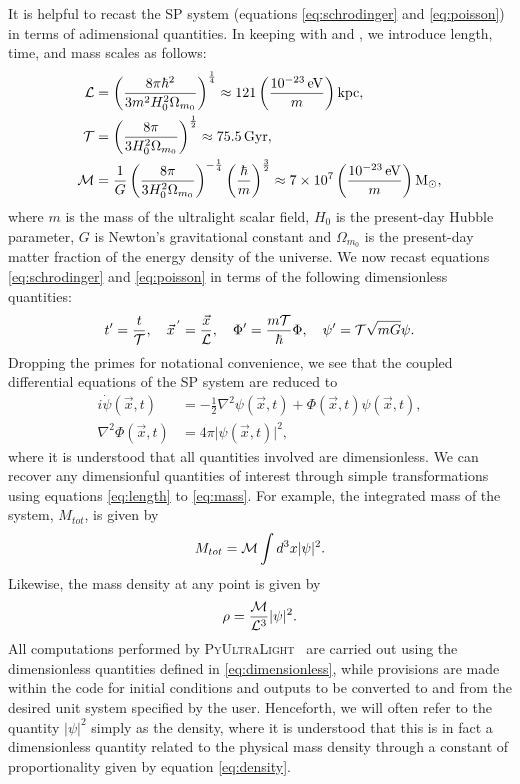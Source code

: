 \documentclass[a4paper,11pt]{article}
\newcommand{\PyUltraLight}{\textsc{PyUltraLight }}
\begin{document}
It is helpful to recast the SP system (equations \ref{eq:schrodinger} and \ref{eq:poisson}) in terms of adimensional quantities. In keeping with \cite{Schive2014} and \cite{Paredes2016}, we introduce length, time, and mass scales as follows:
\begin{align}
    \CMcal{L}&=\left(\frac{8\pi\hbar^2}{3 m^2H_0^2\Omega_{m_0}}\right)^{\frac{1}{4}}\approx121\left(\frac{10^{-23}\operatorname{eV}}{m}\right)\operatorname{kpc},\label{eq:length}\\
    \CMcal{T}&=\left(\frac{8\pi}{3 H_0^2\Omega_{m_0}}\right)^{\frac{1}{2}}\approx75.5 \operatorname{Gyr},\label{eq:time}\\
    \CMcal{M}&=\frac{1}{G}\left(\frac{8\pi}{3 H_0^2\Omega_{m_0}}\right)^{-\frac{1}{4}}\left(\frac{\hbar}{m}\right)^{\frac{3}{2}}\approx 7\times 10^7\left(\frac{10^{-23}\operatorname{eV}}{m}\right)\operatorname{M}_{\odot},\label{eq:mass}
\end{align}
where $m$ is the mass of the ultralight scalar field, $H_0$ is the present-day Hubble parameter, $G$ is Newton's gravitational constant and $\Omega_{m_0}$ is the present-day matter fraction of the energy density of the universe. We now recast equations \ref{eq:schrodinger} and \ref{eq:poisson} in terms of the following dimensionless quantities:
\begin{equation}\label{eq:dimensionless}
    t'=\frac{t}{\CMcal{T}},\quad
    \vec{x}^{\,'}=\frac{\vec{x}}{\CMcal{L}},\quad
    \Phi'=\frac{m\CMcal{T}}{\hbar}\Phi,\quad
    \psi'=\CMcal{T}\sqrt{mG}\psi.
\end{equation}
Dropping the primes for notational convenience, we see that the coupled differential equations of the SP system are reduced to 
\begin{align}
    i\Dot{\psi}(\vec{x},t)&=-\frac{1}{2}\nabla^2\psi(\vec{x},t)+\Phi(\vec{x},t)\psi(\vec{x},t),\label{eq:s-adim}\\
    \nabla^2\Phi(\vec{x},t)&=4\pi\vert\psi(\vec{x},t)\vert^2,\label{eq:p-adim}
\end{align}
where it is understood that all quantities involved are dimensionless. We can recover any dimensionful quantities of interest through simple transformations using equations \ref{eq:length} to \ref{eq:mass}. For example, the integrated mass of the system, $M_{tot}$, is given by
\begin{equation}\label{eq:integrated-mass}
    M_{tot}=\CMcal{M}\int d^3x\vert\psi\vert^2.
\end{equation}
Likewise, the mass density at any point is given by
\begin{equation}\label{eq:density}
    \rho=\frac{\CMcal{M}}{\CMcal{L}^3}\vert\psi\vert^2.
\end{equation}
All computations performed by \PyUltraLight\ are carried out using the dimensionless quantities defined in \ref{eq:dimensionless}, while provisions are made within the code for initial conditions and outputs to be converted to and from the desired unit system specified by the user. Henceforth, we will often refer to the quantity $\vert\psi\vert^2$ simply as the density, where it is understood that this is in fact a dimensionless quantity related to the physical mass density through a constant of proportionality given by equation \ref{eq:density}.
\end{document}
